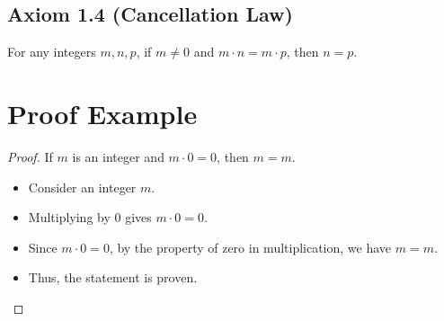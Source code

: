 \subsection*{Axiom 1.4 (Cancellation Law)}
For any integers \(m, n, p\), if \(m \neq 0\) and \(m \cdot n = m \cdot p\), then \(n = p\).


\section*{Proof Example}
\begin{proof}
  If \(m\) is an integer and \(m \cdot 0 = 0\), then \(m = m\).
  \begin{itemize}
    \item Consider an integer \(m\).
    \item Multiplying by \(0\) gives \(m \cdot 0 = 0\).
    \item Since \(m \cdot 0 = 0\), by the property of zero in multiplication, we have \(m = m\).
    \item Thus, the statement is proven.\qedhere
  \end{itemize}
\end{proof}

